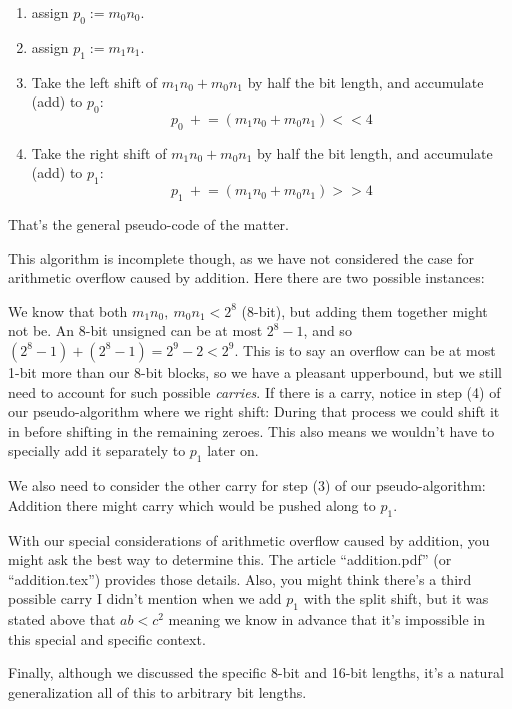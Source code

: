 \documentclass[twoside]{article}
\begin{document}
\begin{enumerate}
\item assign $ p_0:=m_0n_0 $.
\item assign $ p_1:=m_1n_1 $.
\item Take the left shift of $ m_1n_0+m_0n_1 $ by half the bit length, and accumulate (add) to $ p_0 $:
$$ p_0\ +\!=(m_1n_0+m_0n_1)<<4 $$
\item Take the right shift of $ m_1n_0+m_0n_1 $ by half the bit length, and accumulate (add) to $ p_1 $:
$$ p_1\ +\!=(m_1n_0+m_0n_1)>>4 $$
\end{enumerate}

That's the general pseudo-code of the matter.

This algorithm is incomplete though, as we have not considered the case for arithmetic overflow caused by addition.
Here there are two possible instances:

We know that both $ m_1n_0,\ m_0n_1 < 2^8 $ (8-bit), but adding them together might not be. An 8-bit unsigned can be
at most $ 2^8-1 $, and so $ (2^8-1)+(2^8-1)=2^9-2 < 2^9 $. This is to say an overflow can be at most 1-bit more than
our 8-bit blocks, so we have a pleasant upperbound, but we still need to account for such possible \emph{carries}.
If there is a carry, notice in step (4) of our pseudo-algorithm where we right shift: During that process we could
shift it in before shifting in the remaining zeroes. This also means we wouldn't have to specially add it separately
to $ p_1 $ later on.

We also need to consider the other carry for step (3) of our pseudo-algorithm: Addition there might carry which would
be pushed along to $ p_1 $.

With our special considerations of arithmetic overflow caused by addition, you might ask the best way to determine this.
The article ``addition.pdf'' (or ``addition.tex'') provides those details. Also, you might think there's a third possible
carry I didn't mention when we add $ p_1 $ with the split shift, but it was stated above that $ ab < c^2 $ meaning we know
in advance that it's impossible in this special and specific context.

Finally, although we discussed the specific 8-bit and 16-bit lengths, it's a natural generalization all of this to arbitrary
bit lengths.
\end{document}
